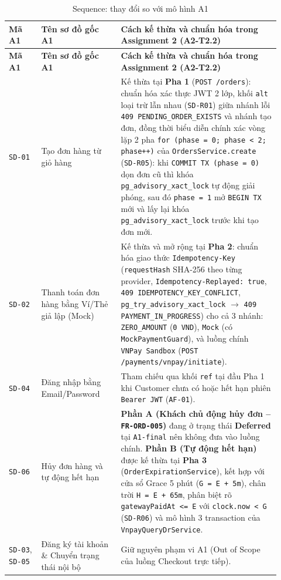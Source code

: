 \begingroup\small
\renewcommand{\arraystretch}{1.2}
\begin{longtable}{>{\raggedright\arraybackslash}p{0.11\linewidth}>{\raggedright\arraybackslash}p{0.27\linewidth}>{\raggedright\arraybackslash}p{0.54\linewidth}}
\caption{Sequence: thay đổi so với mô hình A1}\\
\hline
\textbf{Mã A1} & \textbf{Tên sơ đồ gốc A1} & \textbf{Cách kế thừa và chuẩn hóa trong Assignment 2 (A2-T2.2)} \\ \hline
\endfirsthead
\hline
\textbf{Mã A1} & \textbf{Tên sơ đồ gốc A1} & \textbf{Cách kế thừa và chuẩn hóa trong Assignment 2 (A2-T2.2)} \\ \hline
\endhead
\texttt{SD-01} & Tạo đơn hàng từ giỏ hàng & Kế thừa tại \textbf{Pha 1} (\texttt{POST /orders}): chuẩn hóa xác thực JWT 2 lớp, khối \texttt{alt} loại trừ lẫn nhau (\texttt{SD-R01}) giữa nhánh lỗi \texttt{409 PENDING\_ORDER\_EXISTS} và nhánh tạo đơn, đồng thời biểu diễn chính xác vòng lặp 2 pha \texttt{for (phase = 0; phase < 2; phase++)} của \texttt{OrdersService.create} (\texttt{SD-R05}): khi \texttt{COMMIT TX (phase = 0)} dọn đơn cũ thì khóa \texttt{pg\_advisory\_xact\_lock} tự động giải phóng, sau đó \texttt{phase = 1} mở \texttt{BEGIN TX} mới và lấy lại khóa \texttt{pg\_advisory\_xact\_lock} trước khi tạo đơn mới. \\ \hline
\texttt{SD-02} & Thanh toán đơn hàng bằng Ví/Thẻ giả lập (Mock) & Kế thừa và mở rộng tại \textbf{Pha 2}: chuẩn hóa giao thức \texttt{Idempotency-Key} (\texttt{requestHash} SHA-256 theo từng provider, \texttt{Idempotency-Replayed: true}, \texttt{409 IDEMPOTENCY\_KEY\_CONFLICT}, \texttt{pg\_try\_advisory\_xact\_lock} $\rightarrow$ \texttt{409 PAYMENT\_IN\_PROGRESS}) cho cả 3 nhánh: \texttt{ZERO\_AMOUNT} (\texttt{0 VND}), \texttt{Mock} (có \texttt{MockPaymentGuard}), và luồng chính \texttt{VNPay Sandbox} (\texttt{POST /payments/vnpay/initiate}). \\ \hline
\texttt{SD-04} & Đăng nhập bằng Email/Password & Tham chiếu qua khối \texttt{ref} tại đầu Pha 1 khi Customer chưa có hoặc hết hạn phiên \texttt{Bearer JWT} (\texttt{AF-01}). \\ \hline
\texttt{SD-06} & Hủy đơn hàng và tự động hết hạn & \textbf{Phần A (Khách chủ động hủy đơn -- \texttt{FR-ORD-005})} đang ở trạng thái \textbf{Deferred} tại \texttt{A1-final} nên không đưa vào luồng chính. \textbf{Phần B (Tự động hết hạn)} được kế thừa tại \textbf{Pha 3} (\texttt{OrderExpirationService}), kết hợp với cửa sổ Grace 5 phút (\texttt{G = E + 5m}), chân trời \texttt{H = E + 65m}, phân biệt rõ \texttt{gatewayPaidAt <= E} với \texttt{clock.now < G} (\texttt{SD-R06}) và mô hình 3 transaction của \texttt{VnpayQueryDrService}. \\ \hline
\texttt{SD-03}, \texttt{SD-05} & Đăng ký tài khoản \& Chuyển trạng thái nội bộ & Giữ nguyên phạm vi A1 (Out of Scope của luồng Checkout trực tiếp). \\ \hline
\end{longtable}
\endgroup


